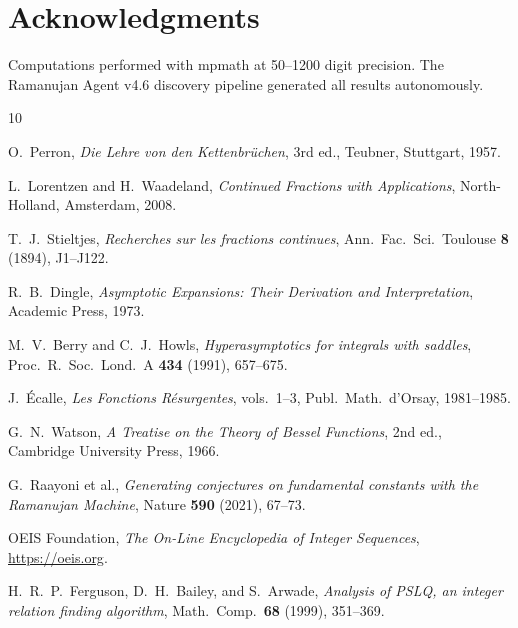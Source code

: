 \documentclass[11pt,a4paper]{article}
\begin{document}
\section*{Acknowledgments}
Computations performed with mpmath at 50--1200 digit precision. The Ramanujan Agent v4.6 discovery pipeline generated all results autonomously.

\begin{thebibliography}{10}

O.~Perron,
\emph{Die Lehre von den Kettenbr\"uchen}, 3rd ed.,
Teubner, Stuttgart, 1957.

L.~Lorentzen and H.~Waadeland,
\emph{Continued Fractions with Applications},
North-Holland, Amsterdam, 2008.

T.~J.~Stieltjes,
\textit{Recherches sur les fractions continues},
Ann.\ Fac.\ Sci.\ Toulouse \textbf{8} (1894), J1--J122.

R.~B.~Dingle,
\emph{Asymptotic Expansions: Their Derivation and Interpretation},
Academic Press, 1973.

M.~V.~Berry and C.~J.~Howls,
\textit{Hyperasymptotics for integrals with saddles},
Proc.\ R.\ Soc.\ Lond.\ A \textbf{434} (1991), 657--675.

J.~\'Ecalle,
\emph{Les Fonctions R\'esurgentes}, vols.~1--3,
Publ.\ Math.\ d'Orsay, 1981--1985.

G.~N.~Watson,
\emph{A Treatise on the Theory of Bessel Functions}, 2nd ed.,
Cambridge University Press, 1966.

G.~Raayoni et al.,
\textit{Generating conjectures on fundamental constants with the Ramanujan Machine},
Nature \textbf{590} (2021), 67--73.

OEIS Foundation,
\emph{The On-Line Encyclopedia of Integer Sequences},
\url{https://oeis.org}.

H.~R.~P.~Ferguson, D.~H.~Bailey, and S.~Arwade,
\textit{Analysis of PSLQ, an integer relation finding algorithm},
Math.\ Comp.\ \textbf{68} (1999), 351--369.

\end{thebibliography}
\end{document}
